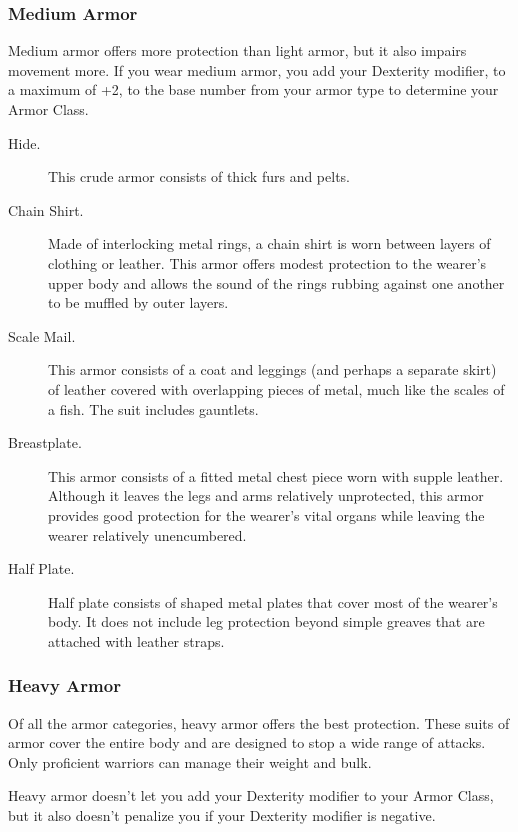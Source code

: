 \subsubsection{Medium Armor}\label{_medium_armor}

Medium armor offers more protection than light armor, but it also
impairs movement more. If you wear medium armor, you add your Dexterity
modifier, to a maximum of +2, to the base number from your armor type to
determine your Armor Class.

\begin{description}
\item[Hide.]
This crude armor consists of thick furs and pelts.
\item[Chain Shirt.]
Made of interlocking metal rings, a chain shirt is worn between layers
of clothing or leather. This armor offers modest protection to the
wearer's upper body and allows the sound of the rings rubbing against
one another to be muffled by outer layers.
\item[Scale Mail.]
This armor consists of a coat and leggings (and perhaps a separate
skirt) of leather covered with overlapping pieces of metal, much like
the scales of a fish. The suit includes gauntlets.
\item[Breastplate.]
This armor consists of a fitted metal chest piece worn with supple
leather. Although it leaves the legs and arms relatively unprotected,
this armor provides good protection for the wearer's vital organs while
leaving the wearer relatively unencumbered.
\item[Half Plate.]
Half plate consists of shaped metal plates that cover most of the
wearer's body. It does not include leg protection beyond simple greaves
that are attached with leather straps.
\end{description}

\subsubsection{Heavy Armor}\label{_heavy_armor}

Of all the armor categories, heavy armor offers the best protection.
These suits of armor cover the entire body and are designed to stop a
wide range of attacks. Only proficient warriors can manage their weight
and bulk.

Heavy armor doesn't let you add your Dexterity modifier to your Armor
Class, but it also doesn't penalize you if your Dexterity modifier is
negative.

